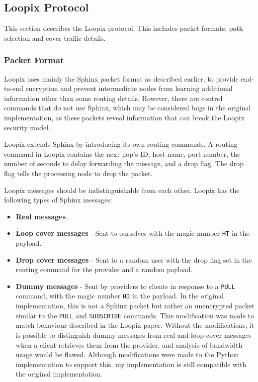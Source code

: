 \documentclass[final,dissertation.tex]{subfiles}
\begin{document}
%

\subsection{Loopix Protocol}

This section describes the Loopix protocol. This includes packet formats, path selection and cover traffic details.

\subsubsection{Packet Format}

Loopix uses mainly the Sphinx packet format as described earlier, to provide end-to-end encryption and prevent intermediate nodes from learning additional information other than some routing details. However, there are control commands that do not use Sphinx, which may be considered bugs in the original implementation, as these packets reveal information that can break the Loopix security model. 

Loopix extends Sphinx by introducing its own routing commands. A routing command in Loopix contains the next hop's ID, host name, port number, the number of seconds to delay forwarding the message, and a drop flag. The drop flag tells the processing node to drop the packet.

Loopix messages should be indistinguishable from each other. Loopix has the following types of Sphinx messages: 

\begin{itemize}
	\item \textbf{Real messages}
	\item \textbf{Loop cover messages} - Sent to ourselves with the magic number \verb|HT| in the payload.
	\item \textbf{Drop cover messages} - Sent to a random user with the drop flag set in the routing command for the provider and a random payload.
	\item \textbf{Dummy messages} - Sent by providers to clients in response to a \verb|PULL| command, with the magic number \verb|HD| in the payload. In the original implementation, this is not a Sphinx packet but rather an unencrypted packet similar to the \verb|PULL| and \verb|SUBSCRIBE| commands. This modification was made to match behaviour described in the Loopix paper. Without the modifications, it is possible to distinguish dummy messages from real and loop cover messages when a client retrieves them from the provider, and analysis of bandwidth usage would be flawed. Although modifications were made to the Python implementation to support this, my implementation is still compatible with the original implementation.
\end{itemize}
\end{document}
